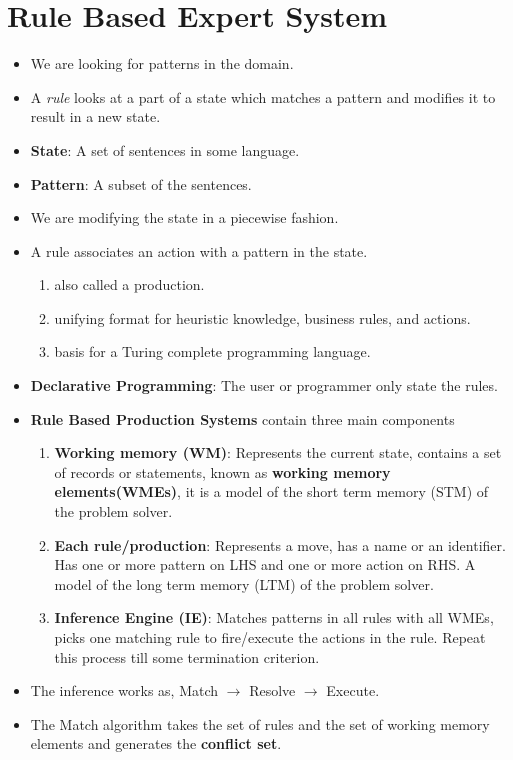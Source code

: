 \documentclass[a4paper]{article}
\begin{document}
\section{Rule Based Expert System}
\begin{itemize}
    \item We are looking for patterns in the domain.
    \item A \textit{rule} looks at a part of a state which matches a pattern and modifies it to result in a new state.
    \item \textbf{State}: A set of sentences in some language.
    \item \textbf{Pattern}: A subset of the sentences.
    \item We are modifying the state in a piecewise fashion.
    \item A rule associates an action with a pattern in the state.
    \begin{enumerate}
        \item also called a production.
        \item unifying format for heuristic knowledge, business rules, and actions.
        \item basis for a Turing complete programming language.
    \end{enumerate}
    \item \textbf{Declarative Programming}: The user or programmer only state the rules.
    \item \textbf{Rule Based Production Systems} contain three main components
    \begin{enumerate}
        \item \textbf{Working memory (WM)}: Represents the current state, contains a set of records or statements, known as \textbf{working memory elements(WMEs)}, it is a model of the short term memory (STM) of the problem solver.
        \item \textbf{Each rule/production}: Represents a move, has a name or an identifier. Has one or more pattern on LHS and one or more action on RHS. A model of the long term memory (LTM) of the problem solver.
        \item \textbf{Inference Engine (IE)}: Matches patterns in all rules with all WMEs, picks one matching rule to fire/execute the actions in the rule. Repeat this process till some termination criterion.
    \end{enumerate}
    \item The inference works as, Match $\to$ Resolve $\to$ Execute.
    \item The Match algorithm takes the set of rules and the set of working memory elements and generates the \textbf{conflict set}.

\end{itemize}
\end{document}
